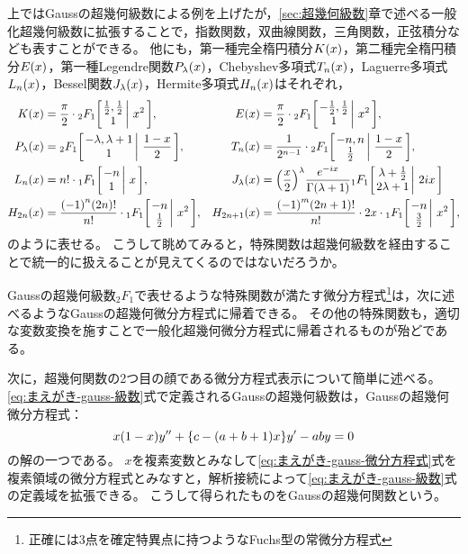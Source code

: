 \documentclass[a4paper,draft]{ltjsarticle}
\begin{document}
上ではGaussの超幾何級数による例を上げたが，\ref{sec:超幾何級数}章で述べる一般化超幾何級数に拡張することで，指数関数，双曲線関数，三角関数，正弦積分なども表すことができる。
他にも，第一種完全楕円積分$\fun{K}{x}$，第二種完全楕円積分$\fun{E}{x}$，第一種Legendre関数$\fun{P_\lambda}{x}$，Chebyshev多項式$\fun{T_n}{x}$，Laguerre多項式$\fun{L_n}{x}$，Bessel関数$\fun{J_\lambda}{x}$，Hermite多項式$\fun{H_n}{x}$はそれぞれ，
\begin{align}
    \fun{K}{x}&=\dfrac{\pi}{2}\cdot \Gauss{\frac{1}{2}}{\frac{1}{2}}{1}{x^2},
    &\fun{E}{x}&=\dfrac{\pi}{2}\cdot \Gauss{-\frac{1}{2}}{\frac{1}{2}}{1}{x^2},
    \\
    \fun{P_\lambda}{x}&=\Gauss{-\lambda}{\lambda+1}{1}{\frac{1-x}{2}},
    &\fun{T_n}{x}&=\dfrac{1}{2^{n-1}}\cdot \Gauss{-n}{n}{\frac{1}{2}}{\frac{1-x}{2}},
    \\
    \fun{L_n}{x}&=n!\cdot \pfq{1}{1}{-n}{1}{x},
    &\fun{J_\lambda}{x}&=\pare{\frac{x}{2}}^\lambda \frac{e^{-ix}}{\fun{\Gamma}{\lambda+1}}\pfq{1}{1}{\lambda+\frac{1}{2}}{2\lambda+1}{2ix}
    \\
    \fun{H_{2n}}{x}&=\dfrac{\pare{-1}^n\pare{2n}!}{n!}\cdot \pfq{1}{1}{-n}{\frac{1}{2}}{x^2},
    &\fun{H_{2n+1}}{x}&=\dfrac{\pare{-1}^m\pare{2n+1}!}{n!}\cdot 2x\cdot \pfq{1}{1}{-n}{\frac{3}{2}}{x^2},
\end{align}
のように表せる。
こうして眺めてみると，特殊関数は超幾何級数を経由することで統一的に扱えることが見えてくるのではないだろうか。

Gaussの超幾何級数${}_2F_1$で表せるような特殊関数が満たす微分方程式\footnote{正確には3点を確定特異点に持つようなFuchs型の常微分方程式}は，次に述べるようなGaussの超幾何微分方程式に帰着できる。
その他の特殊関数も，適切な変数変換を施すことで一般化超幾何微分方程式に帰着されるものが殆どである。

次に，超幾何関数の2つ目の顔である微分方程式表示について簡単に述べる。
\eqref{eq:まえがき-gauss-級数}式で定義されるGaussの超幾何級数は，Gaussの超幾何微分方程式：
\begin{equation}
    \label{eq:まえがき-gauss-微分方程式}
    x\pare{1-x} y'' + \bra{c - \pare{a + b + 1} x} y' - ab y = 0
\end{equation}
の解の一つである。
$x$を複素変数とみなして\eqref{eq:まえがき-gauss-微分方程式}式を複素領域の微分方程式とみなすと，解析接続によって\eqref{eq:まえがき-gauss-級数}式の定義域を拡張できる。
こうして得られたものをGaussの超幾何関数という。
\end{document}
